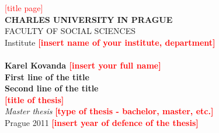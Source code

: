\pagestyle{empty}
\begin{center}
\textcolor{red}{[title page]} \\
\textbf{\LARGE{CHARLES UNIVERSITY IN PRAGUE}}\\
\Large{FACULTY OF SOCIAL SCIENCES}\\
\large{Institute }\normalsize{\textbf{\textcolor{red}{[insert name of your institute, department]}}} \\
\\  %
\textbf{\large{Karel Kovanda
}}\normalsize{\textbf{\textcolor{red}{[insert your full name]}}} \\
\vspace{10mm} \textbf{\LARGE{First line of the title}\\
 \LARGE{Second line of the title}}\\
\normalsize{\textbf{\textcolor{red}{[title of thesis]}}} \\
\vspace{11mm} \textit{\Large{Master thesis}}
\normalsize{\textbf{\textcolor{red}{[type of thesis - bachelor,
master, etc.]}}}\\
\vspace{40mm} \large{Prague 2011}
\normalsize{\textbf{\textcolor{red}{[insert year of defence of the
thesis]}}}
\end{center}
\newpage

